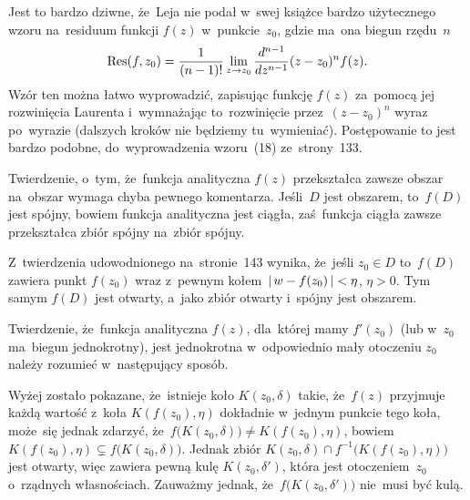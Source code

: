 \documentclass[a4paper,11pt]{article}
\begin{document}
\vspace{\spaceFour}





\noindent
{} Jest to bardzo dziwne, że~Leja nie podał w~swej książce bardzo
użytecznego wzoru na~residuum funkcji $f( z )$ w~punkcie~$z_{ 0 }$, gdzie
ma~ona biegun rzędu~$n$
\begin{equation}
  \label{eq:Leja-Funkcje-zespolone-48}
  \textrm{Res}( f, z_{ 0 } ) =
  \frac{ 1 }{ ( n - 1 )! }
  \lim\limits_{ z \to z_{ 0 } }
  \frac{ d^{ n - 1 } }{ dz^{ n - 1 } } ( z - z_{ 0 } )^{ n } f( z ).
\end{equation}
Wzór ten można łatwo wyprowadzić, zapisując funkcję $f( z )$ za~pomocą
jej rozwinięcia Laurenta i~wymnażając to~rozwinięcie
przez~$( z - z_{ 0 } )^{ n }$ wyraz po~wyrazie (dalszych kroków nie
będziemy tu~wymieniać). Postępowanie to jest bardzo podobne,
do~wyprowadzenia wzoru~(18) ze~strony~133.

\vspace{\spaceFour}





\noindent
{} Twierdzenie, o~tym, że~funkcja analityczna $f( z )$ przekształca
zawsze obszar na~obszar wymaga chyba pewnego komentarza. Jeśli~$D$ jest
obszarem, to~$f( D )$ jest spójny, bowiem funkcja analityczna jest ciągła,
zaś~funkcja ciągła zawsze przekształca zbiór spójny na~zbiór spójny.

Z~twierdzenia udowodnionego na~stronie~143 wynika, że~jeśli
$z_{ 0 } \in D$ to~$f( D )$ zawiera punkt $f( z_{ 0 } )$ wraz z~pewnym
kołem~$|\, {  w - f( z_{ 0 } )  } \,| < \eta$, $\eta > 0$. Tym samym
$f( D )$ jest otwarty, a~jako zbiór otwarty i~spójny jest obszarem.

\vspace{\spaceFour}





\noindent
{} Twierdzenie, że~funkcja analityczna $f( z )$, dla~której mamy
$f'( z_{ 0 } )$ (lub w~$z_{ 0 }$ ma~biegun jednokrotny), jest jednokrotna
w~odpowiednio mały otoczeniu $z_{ 0 }$ należy rozumieć w~następujący sposób.

Wyżej zostało pokazane, że~istnieje koło $K( z_{ 0 }, \delta )$ takie,
że~$f( z )$ przyjmuje każdą wartość z~koła $K( f( z_{ 0 } ), \eta )$
dokładnie w~jednym punkcie tego koła, może~się jednak zdarzyć,
że~$f\big( K( z_{ 0 }, \delta ) \big) \neq K( f( z_{ 0 } ), \eta )$, bowiem
$K( f( z_{ 0 } ), \eta ) \subsetneq f\big( K( z_{ 0 }, \delta ) \big)$. Jednak zbiór
$K( z_{ 0 }, \delta ) \cap f^{ -1 }\big( K( f( z_{ 0 } ), \eta ) \big)$ jest otwarty,
więc zawiera pewną kulę $K( z_{ 0 }, \delta' )$, która jest otoczeniem~$z_{ 0 }$
o~rządnych własnościach. Zauważmy jednak,
że~$f\big( K( z_{ 0 }, \delta' ) \big)$ nie~musi być kulą.
\end{document}
